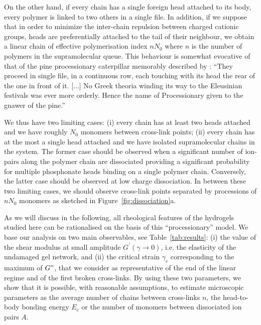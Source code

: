 \documentclass[journal=jacsat,manuscript=article]{achemso}
\begin{document}
On the other hand, if every chain has a single foreign head attached to its body, every polymer is linked to two others in a single file. In addition, if we suppose that in order to minimize the inter-chain repulsion between charged cationic groups, heads are preferentially attached to the tail of their neighbour, we obtain a linear chain of effective polymerisation index $n N_0$ where $n$ is the number of polymers in the supramolecular queue. This behaviour is somewhat evocative of that of the pine processionary caterpillar memorably described by \citet{Fabre1916}: 
``They proceed in single file, in a continuous row, each touching with its head the rear of the one in front of it. [...] No Greek theoria winding its way to the Eleusinian festivals was ever more orderly. Hence the name of Processionary given to the gnawer of the pine.''



We thus have two limiting cases: (i) every chain has at least two heads attached and we have roughly $N_0$ monomers between cross-link points; (ii) every chain has at the most a single head attached and we have isolated supramolecular chains in the system. The former case should be observed when a significant number of ion-pairs along the polymer chain are dissociated providing a significant probability for multiple phosphonate heads binding on a single polymer chain. Conversely, the latter case should be observed at low charge dissociation. In between these two limiting cases, we should observe cross-link points separated by processions of $n N_0$ monomers as sketched in Figure~\ref{fig:dissociation}a.

As we will discuss in the following, all rheological features of the hydrogels studied here can  be rationalised on the basis of this ``processionary'' model. We base our analysis on two main observables, see Table~\ref{tab:results}: (i) the value of the shear modulus at small amplitude $G^\prime(\gamma\rightarrow 0)$, i.e. the elasticity of the undamaged gel network, and (ii) the critical strain $\gamma_c$ corresponding to the maximum of $G"$, that we consider as representative of the end of the linear regime and of the first broken cross-links\cite{Hyun2011}. By using these two parameters, we show that it is possible, with reasonable assumptions, to estimate microscopic parameters as the average number of chains between cross-links $n$, the head-to-body bonding energy $E_c$ or the number of monomers between dissociated ion pairs $A$.
\end{document}
